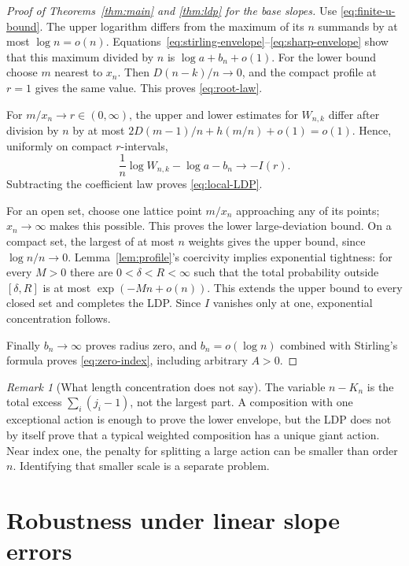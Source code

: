 \documentclass[11pt,a4paper]{article}
\numberwithin{equation}{section}
\theoremstyle{definition}
\theoremstyle{remark}
\newtheorem{remark}[theorem]{Remark}
\begin{document}
\begin{proof}[Proof of Theorems~\ref{thm:main} and \ref{thm:ldp}
for the base slopes]
Use \eqref{eq:finite-u-bound}. The upper logarithm differs from the
maximum of its $n$ summands by at most $\log n=o(n)$.
Equations~\eqref{eq:stirling-envelope}--\eqref{eq:sharp-envelope} show
that this maximum divided by $n$ is $\log a+b_n+o(1)$.
For the lower bound choose $m$ nearest to $x_n$. Then
$D(n-k)/n\to0$, and the compact profile at $r=1$ gives the same value.
This proves \eqref{eq:root-law}.

For $m/x_n\to r\in(0,\infty)$, the upper and lower estimates for
$W_{n,k}$ differ after division by $n$ by at most
$2D(m-1)/n+h(m/n)+o(1)=o(1)$. Hence, uniformly on compact $r$-intervals,
\begin{equation}
 \frac1n\log W_{n,k}-\log a-b_n\longrightarrow-I(r).
 \label{eq:local-W}
\end{equation}
Subtracting the coefficient law proves \eqref{eq:local-LDP}.

For an open set, choose one lattice point $m/x_n$ approaching any of its
points; $x_n\to\infty$ makes this possible. This proves the lower
large-deviation bound. On a compact set, the largest of at most $n$
weights gives the upper bound, since $\log n/n\to0$.
Lemma~\ref{lem:profile}'s coercivity implies exponential tightness: for
every $M>0$ there are $0<\delta<R<\infty$ such that the total probability
outside $[\delta,R]$ is at most $\exp(-Mn+o(n))$.
This extends the upper bound to every closed set and completes the LDP.
Since $I$ vanishes only at one, exponential concentration follows.

Finally $b_n\to\infty$ proves radius zero, and
$b_n=o(\log n)$ combined with Stirling's formula proves
\eqref{eq:zero-index}, including arbitrary $A>0$.
\end{proof}

\begin{remark}[What length concentration does not say]
The variable $n-K_n$ is the total excess $\sum_i(j_i-1)$, not the largest
part. A composition with one exceptional action is enough to prove the
lower envelope, but the LDP does not by itself prove that a typical
weighted composition has a unique giant action. Near index one, the
penalty for splitting a large action can be smaller than order $n$.
Identifying that smaller scale is a separate problem.
\end{remark}

\section{Robustness under linear slope errors}
\label{sec:robustness}
\end{document}
